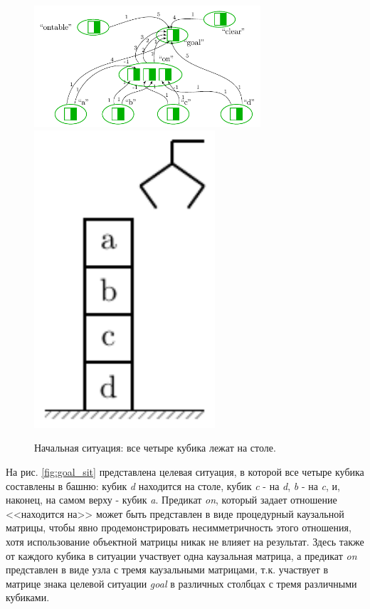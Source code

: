 \documentclass[12pt]{report}
\begin{document}
	\begin{figure}
		\centering
		\includegraphics[width=0.75\textwidth,page=3]{examples/plan/plan_nets}
		\includegraphics[width=0.6\textwidth,page=2]{examples/plan/block_world}
		\caption{Начальная ситуация: все четыре кубика лежат на столе.}	
		\label{fig:start_sit}	
	\end{figure}
	
	На рис. \ref{fig:goal_sit} представлена целевая ситуация, в которой все четыре кубика составлены в башню: кубик \textit{d} находится на столе, кубик \textit{c} - на \textit{d}, \textit{b} - на \textit{c}, и, наконец, на самом верху - кубик \textit{a}. Предикат \textit{on}, который задает отношение <<находится на>> может быть представлен в виде процедурный каузальной матрицы, чтобы явно продемонстрировать несимметричность этого отношения, хотя использование объектной матрицы никак не влияет на результат. Здесь также от каждого кубика в ситуации участвует одна каузальная матрица, а предикат \textit{on} представлен в виде узла с тремя каузальными матрицами, т.к. участвует в матрице знака целевой ситуации \textit{goal} в различных столбцах с тремя различными кубиками.
	
\end{document}
